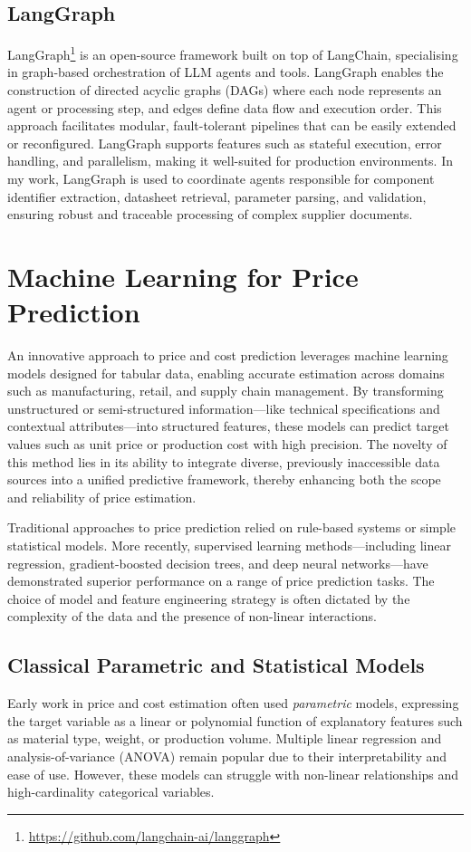 \subsection{LangGraph}
LangGraph\footnote{\url{https://github.com/langchain-ai/langgraph}} is an open-source framework built on top of LangChain, specialising in graph-based orchestration of LLM agents and tools. LangGraph enables the construction of directed acyclic graphs (DAGs) where each node represents an agent or processing step, and edges define data flow and execution order. This approach facilitates modular, fault-tolerant pipelines that can be easily extended or reconfigured. LangGraph supports features such as stateful execution, error handling, and parallelism, making it well-suited for production environments. In my work, LangGraph is used to coordinate agents responsible for component identifier extraction, datasheet retrieval, parameter parsing, and validation, ensuring robust and traceable processing of complex supplier documents.

\section{Machine Learning for Price Prediction}
An innovative approach to price and cost prediction leverages machine learning models designed for tabular data, enabling accurate estimation across domains such as manufacturing, retail, and supply chain management. By transforming unstructured or semi-structured information—like technical specifications and contextual attributes—into structured features, these models can predict target values such as unit price or production cost with high precision. The novelty of this method lies in its ability to integrate diverse, previously inaccessible data sources into a unified predictive framework, thereby enhancing both the scope and reliability of price estimation.

Traditional approaches to price prediction relied on rule-based systems or simple statistical models. More recently, supervised learning methods—including linear regression, gradient-boosted decision trees, and deep neural networks—have demonstrated superior performance on a range of price prediction tasks. The choice of model and feature engineering strategy is often dictated by the complexity of the data and the presence of non-linear interactions.

\subsection{Classical Parametric and Statistical Models}
Early work in price and cost estimation often used \emph{parametric} models, expressing the target variable as a linear or polynomial function of explanatory features such as material type, weight, or production volume. Multiple linear regression and analysis-of-variance (ANOVA) remain popular due to their interpretability and ease of use. However, these models can struggle with non-linear relationships and high-cardinality categorical variables.

